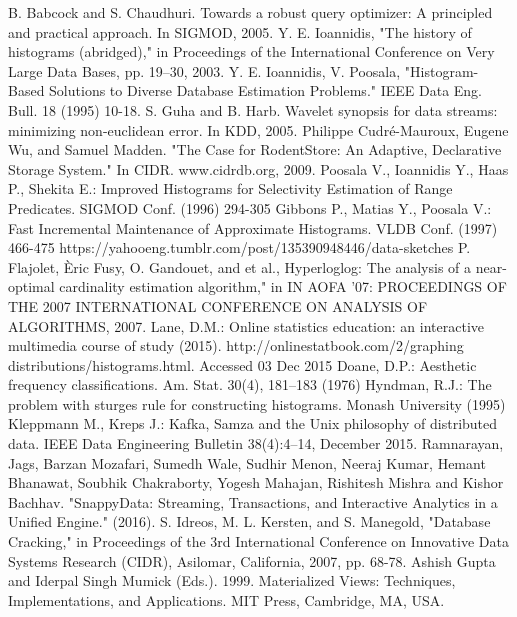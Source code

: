 \documentclass[10pt, conference, compsocconf]{IEEEtran}
\begin{document}
\begin{thebibliography}{1}
B. Babcock and S. Chaudhuri. Towards a robust query optimizer: A principled and practical approach. In SIGMOD, 2005.
Y. E. Ioannidis, "The history of histograms (abridged)," in Proceedings of the International Conference on Very Large Data Bases, pp. 19–30, 2003.
Y. E. Ioannidis, V. Poosala, "Histogram-Based Solutions to
Diverse Database Estimation Problems." IEEE Data Eng. Bull. 18 (1995) 10-18.
S. Guha and B. Harb. Wavelet synopsis for data streams: minimizing non-euclidean error. In KDD, 2005.
Philippe Cudré-Mauroux, Eugene Wu, and Samuel Madden. "The Case for RodentStore: An Adaptive, Declarative Storage System." In CIDR. www.cidrdb.org, 2009.
Poosala V., Ioannidis Y., Haas P., Shekita E.: Improved Histograms for Selectivity Estimation of Range Predicates. SIGMOD Conf. (1996) 294-305
Gibbons P., Matias Y., Poosala V.: Fast Incremental Maintenance of Approximate Histograms. VLDB Conf. (1997) 466-475
https://yahooeng.tumblr.com/post/135390948446/data-sketches
P. Flajolet, \`{E}ric Fusy, O. Gandouet, and et al., Hyperloglog: The analysis of a near-optimal cardinality estimation algorithm," in IN AOFA '07: PROCEEDINGS OF THE 2007 INTERNATIONAL CONFERENCE ON ANALYSIS OF ALGORITHMS, 2007.
Lane, D.M.: Online statistics education: an interactive multimedia course of study (2015). http://onlinestatbook.com/2/graphing distributions/histograms.html. Accessed 03 Dec 2015
Doane, D.P.: Aesthetic frequency classifications. Am. Stat. 30(4), 181–183 (1976)
Hyndman, R.J.: The problem with sturges rule for constructing histograms. Monash University (1995)
Kleppmann M., Kreps J.: Kafka, Samza and the Unix philosophy of distributed data. IEEE Data Engineering Bulletin 38(4):4–14, December 2015.
Ramnarayan, Jags, Barzan Mozafari, Sumedh Wale, Sudhir Menon, Neeraj Kumar, Hemant Bhanawat, Soubhik Chakraborty, Yogesh Mahajan, Rishitesh Mishra and Kishor Bachhav. "SnappyData: Streaming, Transactions, and Interactive Analytics in a Unified Engine." (2016).
S. Idreos, M. L. Kersten, and S. Manegold, "Database Cracking," in Proceedings of the 3rd International Conference on Innovative Data Systems Research (CIDR), Asilomar, California, 2007, pp. 68-78.
Ashish Gupta and Iderpal Singh Mumick (Eds.). 1999. Materialized Views: Techniques, Implementations, and Applications. MIT Press, Cambridge, MA, USA.
\end{thebibliography}
\end{document}
